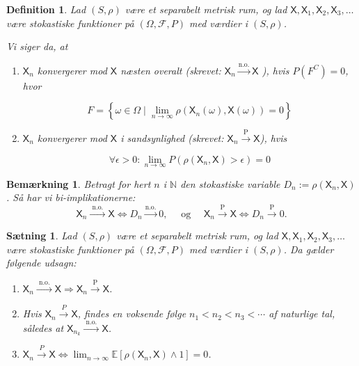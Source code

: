\documentclass{article}
\newcommand{\1}{\mathbbm{1}}
\newcommand{\X}{\mathsf{X}}
\theoremstyle{boxed}
\newtheorem{definition}[theorem]{Definition}
\newtheorem{remark}[theorem]{Bemærkning}
\newtheorem{proposition}[theorem]{Sætning}
\begin{document}
\begin{theorem-box}
    \begin{definition}
        Lad $(S, \rho)$ være et separabelt metrisk rum, og lad $\X, \X_1, \X_2, \X_3, \ldots$ være stokastiske funktioner på $(\Omega, \mathcal{F}, P)$ med værdier i $(S, \rho)$.

Vi siger da, at
\begin{enumerate}
    \item[\textnormal{(a)}] $\X_n$ konvergerer mod $\X$ næsten overalt (skrevet: $\X_n \xrightarrow{\text{n.o.}} \X$ ), hvis $P(F^C)=0$, hvor

    $$
    F=\left\{\omega \in \Omega \mid \lim _{n \rightarrow \infty} \rho\left(\X_n(\omega), \X(\omega)\right)=0\right\}
    $$
    
    \item[\textnormal{(b)}] $\X_n$ konvergerer mod $\X$ i sandsynlighed (skrevet: $\X_n \xrightarrow{\mathrm{P}} \X$), hvis

    $$
    \forall \epsilon>0: \lim _{n \rightarrow \infty} P\left(\rho\left(\X_n, \X\right)>\epsilon\right)=0
    $$
\end{enumerate}
    \end{definition}
\end{theorem-box}
\begin{remark}
    Betragt for hert $n$ i $\mathbb{N}$ den stokastiske variable $D_n:=\rho\left(\X_n, \X\right)$. Så har vi bi-implikationerne:
$$
\X_n \xrightarrow{\text { n.o. }} \X \Longleftrightarrow D_n \xrightarrow{\text {n.o.}} 0, \quad \text { og } \quad \X_n \xrightarrow{\mathrm{P}} \X \Longleftrightarrow D_n \xrightarrow{\mathrm{P}} 0 .
$$

\end{remark}
\begin{theorem-box}
    \begin{proposition}
        Lad $(S, \rho)$ være et separabelt metrisk rum, og lad $\X, \X_1, \X_2, \X_3, \ldots$ være stokastiske funktioner på $(\Omega, \mathcal{F}, P)$ med værdier i $(S, \rho)$.
Da gælder følgende udsagn:
\begin{enumerate}
    \item[\textnormal{(i)}] $\X_n \xrightarrow{\text { n.o. }} \X \Longrightarrow \X_n \xrightarrow{\mathrm{P}} \X$.
    \item[\textnormal{(ii)}] Hvis $\X_n \xrightarrow{P} \X$, findes en voksende følge $n_1<n_2<n_3<\cdots$ af naturlige tal, således at $\X_{n_k} \xrightarrow{\text { n.o. }} \X$.
    \item[\textnormal{(iii)}] $\X_n \xrightarrow{P} \X \Longleftrightarrow \lim _{n \rightarrow \infty} \mathbb{E}\left[\rho\left(\X_n, \X\right) \wedge 1\right]=0$.

\end{enumerate}
    \end{proposition}
\end{theorem-box}
\end{document}

